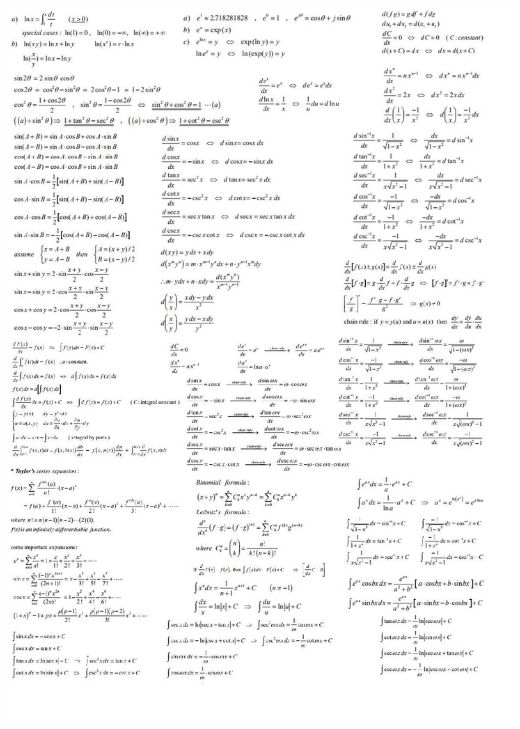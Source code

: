 \documentclass[10pt,twocolumn,oneside]{article}
\begin{document}
	\newpage
    \centering
    \includegraphics[height=\paperheight]{./../codebook/math/number/calculus.jpg}

    
\end{document}
